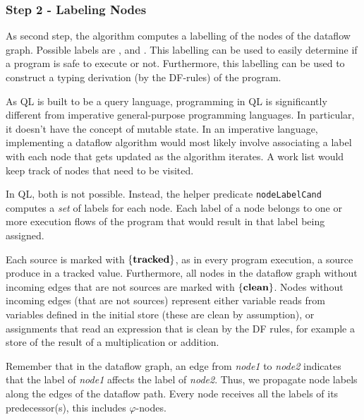 \subsubsection*{Step 2 - Labeling Nodes}
\newcommand{\coloredset}[1]{{\color{red}$\{#1\}$}}
\newcommand{\setclean}{\coloredset{\labclean}}
\newcommand{\settracked}{\coloredset{\labtracked}}
\newcommand{\setboth}{\coloredset{\labclean, \labtracked}}
\newcommand{\clclean}{:\ {\color{red}$\lclean$}}
\newcommand{\cltracked}{:\ {\color{red}$\ltracked$}}
\newcommand{\clunknown}{:\ {\color{red}$\lunknown$}}

As second step, the algorithm computes a labelling of the nodes of the dataflow graph.
Possible labels are \labclean, \labtracked and \labunknown.
This labelling can be used to easily determine if a program is safe to execute or not.
Furthermore, this labelling can be used to construct a typing derivation (by the DF-rules)
of the program.

As QL is built to be a query language, programming in QL is significantly different
from imperative general-purpose programming languages.
In particular, it doesn't have the concept of mutable state.
In an imperative language, implementing a dataflow algorithm would most
likely involve associating a label with each node that gets updated as the 
algorithm iterates.
A work list would keep track of nodes that need to be visited.

In QL, both is not possible.
Instead, the helper predicate \texttt{nodeLabelCand} computes a \emph{set} of
labels for each node.
Each label of a node belongs to one or more execution flows of the program 
that would result in that label being assigned.

Each source is marked with \settracked, as in every program execution,
a source produce in a tracked value.
Furthermore, all nodes in the dataflow graph without
incoming edges that are not sources are marked with \setclean.
Nodes without incoming edges (that are not sources) represent either variable reads 
from variables defined in the initial store (these are clean by assumption), or 
assignments that read an expression that is clean by the DF rules, for example
a store of the result of a multiplication or addition.

Remember that in the dataflow graph, an edge from \textit{node1} to \textit{node2}
indicates that the label of \textit{node1} affects the label of \textit{node2}.
Thus, we propagate node labels along the edges of the dataflow path.
Every node receives all the labels of its predecessor(s), this includes
$\varphi$-nodes.

